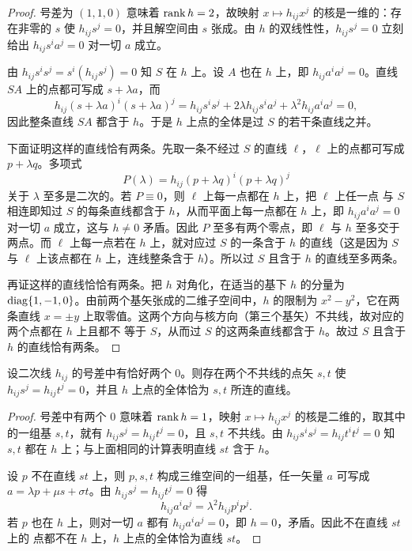 \begin{proof}
号差为 $(1,1,0)$ 意味着 $\operatorname{rank} h=2$，故映射 $x\mapsto h_{ij}x^j$ 的核是一维的：存在非零的
$s$ 使 $h_{ij}s^j=0$，并且解空间由 $s$ 张成。由 $h$ 的双线性性，$h_{ij}s^j=0$ 立刻给出
$h_{ij}s^ia^j=0$ 对一切 $a$ 成立。

由 $h_{ij}s^is^j=s^i(h_{ij}s^j)=0$ 知 $S$ 在 $h$ 上。设 $A$ 也在 $h$ 上，即
$h_{ij}a^ia^j=0$。直线 $SA$ 上的点都可写成 $s+\lambda a$，而
\[
h_{ij}(s+\lambda a)^i(s+\lambda a)^j
=h_{ij}s^is^j+2\lambda h_{ij}s^ia^j+\lambda^2h_{ij}a^ia^j=0,
\]
因此整条直线 $SA$ 都含于 $h$。于是 $h$ 上点的全体是过 $S$ 的若干条直线之并。

下面证明这样的直线恰有两条。先取一条不经过 $S$ 的直线 $\ell$，$\ell$ 上的点都可写成
$p+\lambda q$。多项式
\[
P(\lambda)=h_{ij}(p+\lambda q)^i(p+\lambda q)^j
\]
关于 $\lambda$ 至多是二次的。若 $P\equiv0$，则 $\ell$ 上每一点都在 $h$ 上，把 $\ell$ 上任一点
与 $S$ 相连即知过 $S$ 的每条直线都含于 $h$，从而平面上每一点都在 $h$ 上，即
$h_{ij}a^ia^j=0$ 对一切 $a$ 成立，这与 $h\neq0$ 矛盾。因此 $P$ 至多有两个零点，即 $\ell$ 与
$h$ 至多交于两点。而 $\ell$ 上每一点若在 $h$ 上，就对应过 $S$ 的一条含于 $h$ 的直线（这是因为
$S$ 与 $\ell$ 上该点都在 $h$ 上，连线整条含于 $h$）。所以过 $S$ 且含于 $h$ 的直线至多两条。

再证这样的直线恰恰有两条。把 $h$ 对角化，在适当的基下 $h$ 的分量为
$\operatorname{diag}\{1,-1,0\}$。由前两个基矢张成的二维子空间中，$h$ 的限制为 $x^2-y^2$，它在两条直线
$x=\pm y$ 上取零值。这两个方向与核方向（第三个基矢）不共线，故对应的两个点都在 $h$ 上且都不
等于 $S$，从而过 $S$ 的这两条直线都含于 $h$。故过 $S$ 且含于 $h$ 的直线恰有两条。
\end{proof}

\begin{proposition}
\label{prop:twozero}
设二次线 $h_{ij}$ 的号差中有恰好两个 $0$。则存在两个不共线的点矢 $s,t$ 使
$h_{ij}s^j=h_{ij}t^j=0$，并且 $h$ 上点的全体恰为 $s,t$ 所连的直线。
\end{proposition}

\begin{proof}
号差中有两个 $0$ 意味着 $\operatorname{rank} h=1$，映射 $x\mapsto h_{ij}x^j$ 的核是二维的，取其中的一组基
$s,t$，就有 $h_{ij}s^j=h_{ij}t^j=0$，且 $s,t$ 不共线。由 $h_{ij}s^is^j=h_{ij}t^it^j=0$ 知
$s,t$ 都在 $h$ 上；与上面相同的计算表明直线 $st$ 含于 $h$。

设 $p$ 不在直线 $st$ 上，则 $p,s,t$ 构成三维空间的一组基，任一矢量 $a$ 可写成
$a=\lambda p+\mu s+\sigma t$。由 $h_{ij}s^j=h_{ij}t^j=0$ 得
\[
h_{ij}a^ia^j=\lambda^2h_{ij}p^ip^j .
\]
若 $p$ 也在 $h$ 上，则对一切 $a$ 都有 $h_{ij}a^ia^j=0$，即 $h=0$，矛盾。因此不在直线 $st$ 上的
点都不在 $h$ 上，$h$ 上点的全体恰为直线 $st$。
\end{proof}

